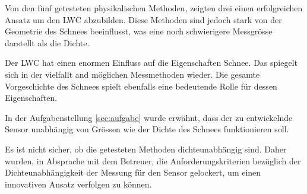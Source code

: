 
Von den fünf getesteten physikalischen Methoden, zeigten drei einen erfolgreichen Ansatz um den LWC abzubilden. Diese Methoden sind jedoch stark von der Geometrie des Schnees beeinflusst, was eine noch schwierigere Messgrösse darstellt als die Dichte.

Der LWC hat einen enormen Einfluss auf die Eigenschaften Schnee. Das spiegelt sich in der vielfallt and möglichen Messmethoden wieder. Die gesamte Vorgeschichte des Schnees spielt ebenfalls eine bedeutende Rolle für dessen Eigenschaften.

In der Aufgabenstellung \ref{sec:aufgabe} wurde erwähnt, dass der zu entwickelnde Sensor unabhängig von Grössen wie der Dichte des Schnees funktionieren soll.


Es ist nicht sicher, ob die getesteten Methoden dichteunabhängig sind. Daher wurden, in Absprache mit dem Betreuer, die Anforderungskriterien bezüglich der Dichteunabhängigkeit der Messung für den Sensor gelockert, um einen innovativen Ansatz verfolgen zu können.
